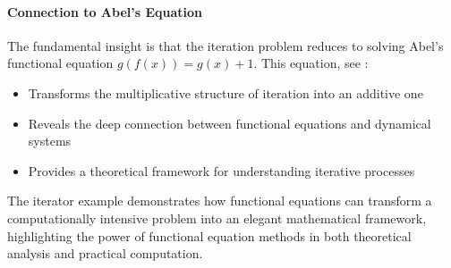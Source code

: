 \paragraph{Connection to Abel's Equation}
The fundamental insight is that the iteration problem reduces to solving Abel's functional equation $g(f(x)) = g(x) + 1$. This equation, see \cite{Abe:26b}:
\begin{itemize}
\item Transforms the multiplicative structure of iteration into an additive one
\item Reveals the deep connection between functional equations and dynamical systems
\item Provides a theoretical framework for understanding iterative processes
\end{itemize}

The iterator example demonstrates how functional equations can transform a computationally intensive problem into an elegant mathematical framework, highlighting the power of functional equation methods in both theoretical analysis and practical computation. 